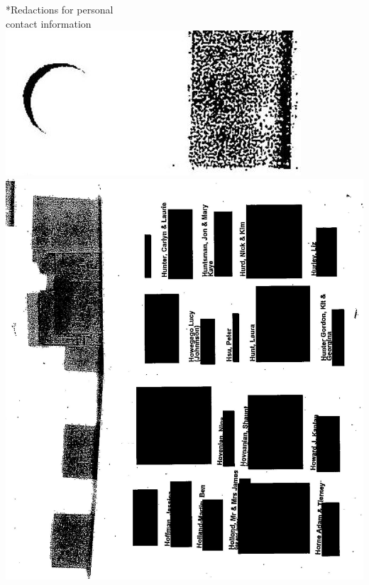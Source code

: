 \documentclass[10pt]{article}
\begin{document}
*Redactions for personal\\
contact information\\
\includegraphics[max width=\textwidth, center]{2025_02_27_dd68c3d38de88f0516d9g-149}\\
\includegraphics[max width=\textwidth, center]{2025_02_27_dd68c3d38de88f0516d9g-149(1)}\\
\end{document}
